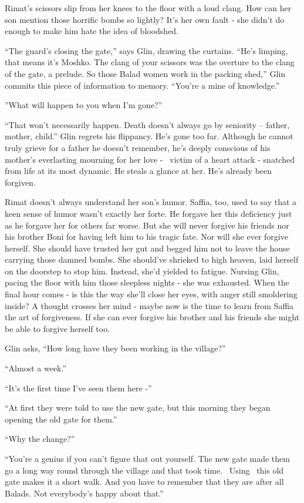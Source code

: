 \documentclass[twoside,11pt]{book}
\begin{document}
Rimat's scissors slip from her knees to the floor with a loud clang. How can her son mention those horrific bombs so
lightly? It's her own fault - she didn't do enough to make him hate the idea of bloodshed.

``The guard's closing the gate,'' says Glin, drawing the curtains. ``He's limping, that means it's Moshko. The clang
of your scissors was the overture to the clang of the gate, a prelude. So those Balad women work in the packing shed,''
Glin commits this piece of information to memory. ``You're a mine of knowledge.''

''What will happen to you when I'm gone?''

``That won't necessarily happen. Death doesn't always go by seniority -- father, mother, child.'' Glin regrets his
flippancy. He's gone too far. Although he cannot truly grieve for a father he doesn't remember, he's deeply conscious
of his mother's everlasting mourning for her love - \ victim of a heart attack - snatched from life at its most
dynamic. He steals a glance at her. He's already been forgiven.

Rimat doesn't always understand her son's humor. Saffia, too, used to
say that a keen sense of humor wasn't exactly her forte. He forgave
her this deficiency just as he forgave her for others far worse. But
she will never forgive his friends nor his brother Boni for having
left him to his tragic fate.  Nor will she ever forgive herself.  She
should have trusted her gut and begged him not to leave the house
carrying those damned bombs. She should've shrieked to high heaven,
laid herself on the doorstep to stop him. Instead, she'd yielded to
fatigue. Nursing Glin, pacing the floor with him those sleepless
nights - she was exhausted. When the final hour comes - is this the
way she'll close her eyes, with anger still smoldering inside? A
thought crosses her mind - maybe now is the time to learn from Saffia
the art of forgiveness. If she can ever forgive his brother and his
friends she might be able to forgive herself too.

Glin asks, ``How long have they been working in the village?''

``Almost a week.''

``It's the first time I've seen them here -''

``At first they were told to use the new gate, but this morning they
began opening the old gate for them.''

``Why
the change?''

``You're a genius if you can't figure that out yourself. The new gate made them go a long way round
through the village and that took time. \ Using \ this old gate makes it a short walk. And you have to remember that
they are after all Balads. Not everybody's happy about that.''
\end{document}
